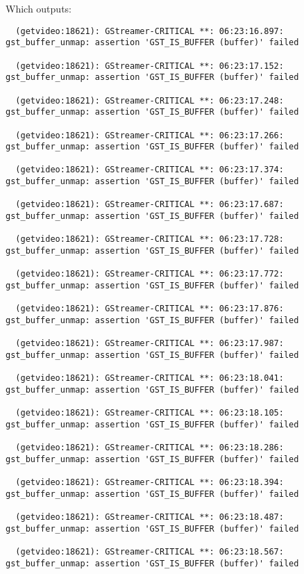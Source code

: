 \documentclass[12pt,oneside]{book}
\begin{document}
Which outputs:

\begin{lstlisting}
  (getvideo:18621): GStreamer-CRITICAL **: 06:23:16.897: gst_buffer_unmap: assertion 'GST_IS_BUFFER (buffer)' failed

  (getvideo:18621): GStreamer-CRITICAL **: 06:23:17.152: gst_buffer_unmap: assertion 'GST_IS_BUFFER (buffer)' failed

  (getvideo:18621): GStreamer-CRITICAL **: 06:23:17.248: gst_buffer_unmap: assertion 'GST_IS_BUFFER (buffer)' failed

  (getvideo:18621): GStreamer-CRITICAL **: 06:23:17.266: gst_buffer_unmap: assertion 'GST_IS_BUFFER (buffer)' failed

  (getvideo:18621): GStreamer-CRITICAL **: 06:23:17.374: gst_buffer_unmap: assertion 'GST_IS_BUFFER (buffer)' failed

  (getvideo:18621): GStreamer-CRITICAL **: 06:23:17.687: gst_buffer_unmap: assertion 'GST_IS_BUFFER (buffer)' failed

  (getvideo:18621): GStreamer-CRITICAL **: 06:23:17.728: gst_buffer_unmap: assertion 'GST_IS_BUFFER (buffer)' failed

  (getvideo:18621): GStreamer-CRITICAL **: 06:23:17.772: gst_buffer_unmap: assertion 'GST_IS_BUFFER (buffer)' failed

  (getvideo:18621): GStreamer-CRITICAL **: 06:23:17.876: gst_buffer_unmap: assertion 'GST_IS_BUFFER (buffer)' failed

  (getvideo:18621): GStreamer-CRITICAL **: 06:23:17.987: gst_buffer_unmap: assertion 'GST_IS_BUFFER (buffer)' failed

  (getvideo:18621): GStreamer-CRITICAL **: 06:23:18.041: gst_buffer_unmap: assertion 'GST_IS_BUFFER (buffer)' failed

  (getvideo:18621): GStreamer-CRITICAL **: 06:23:18.105: gst_buffer_unmap: assertion 'GST_IS_BUFFER (buffer)' failed

  (getvideo:18621): GStreamer-CRITICAL **: 06:23:18.286: gst_buffer_unmap: assertion 'GST_IS_BUFFER (buffer)' failed

  (getvideo:18621): GStreamer-CRITICAL **: 06:23:18.394: gst_buffer_unmap: assertion 'GST_IS_BUFFER (buffer)' failed

  (getvideo:18621): GStreamer-CRITICAL **: 06:23:18.487: gst_buffer_unmap: assertion 'GST_IS_BUFFER (buffer)' failed

  (getvideo:18621): GStreamer-CRITICAL **: 06:23:18.567: gst_buffer_unmap: assertion 'GST_IS_BUFFER (buffer)' failed


\end{lstlisting}
\end{document}

